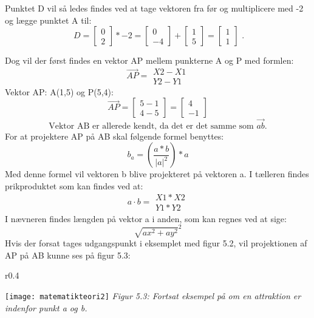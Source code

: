 Punktet D vil så ledes findes  ved at tage vektoren fra før og multiplicere med -2 og lægge punktet A til:
\[\ D = \begin{bmatrix} 0 \\ 2 \end{bmatrix} * -2 = \begin{bmatrix} 0 \\ -4 \end{bmatrix} + \begin{bmatrix} 1 \\ 5 \end{bmatrix} = \begin{bmatrix} 1 \\ 1 \end{bmatrix} \text{ .} \]


Dog vil der først findes en vektor AP mellem punkterne A og P med formlen: \[ \overrightarrow{AP} = \begin{matrix}X2-X1 \\ Y2-Y1\end{matrix} \]
Vektor AP: A(1,5) og P(5,4): \[ \overrightarrow{AP} = \begin{bmatrix}5-1 \\ 4-5\end{bmatrix} = \begin{bmatrix} 4 \\ -1 \end{bmatrix} \]
\[ \text{Vektor AB er allerede kendt, da det er det samme som } \overrightarrow{ab} \text{.} \]
For at projektere AP på AB skal følgende formel benyttes: \citep{ProjektionAfVektor} \[ b_{a} = (\frac{a*b}{|a|^2}) * a \]
Med denne formel vil vektoren b blive projekteret på vektoren a. I tælleren findes prikproduktet som kan findes ved at: \[ a \cdot b = \begin{matrix}X1 * X2 \\ Y1 * Y2\end{matrix}  \]
I nævneren findes længden på vektor a i anden, som kan regnes ved at sige: \[ \sqrt{ax^2+ay^2}^2 \]
Hvis der forsat tages udgangspunkt i eksemplet med figur 5.2, vil projektionen af AP på AB kunne ses på figur 5.3:

\begin{wrapfigure}{r}{0.4\textwidth}
	\vspace{-20pt}
	\begin{center}
		\texttt{[image: matematikteori2]} \newline
		\textit{Figur 5.3: Fortsat eksempel på om en attraktion er indenfor punkt a og b.}\newline
	\end{center}
	\vspace{-20pt}
\end{wrapfigure}

